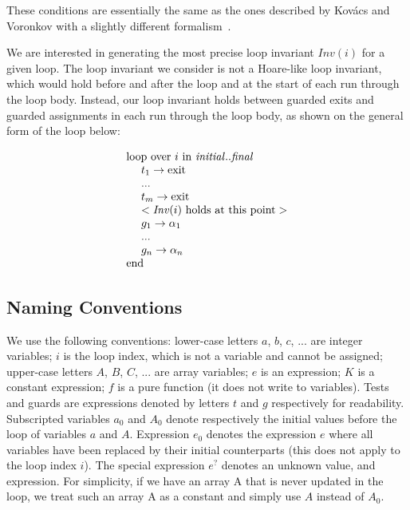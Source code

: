 \documentclass[a4paper,10pt]{article}
\newcommand{\idx}{\ensuremath{i}\xspace}
\newcommand{\idxinitial}{\ensuremath{\mathit{initial}}\xspace}
\newcommand{\idxfinal}{\ensuremath{\mathit{final}}\xspace}
\newcommand{\KWloop}{\ensuremath{\mathrm{loop}~}}
\newcommand{\KWend}{\ensuremath{\mathrm{end}~}}
\newcommand{\KWover}{\ensuremath{\mathrm{over}~}}
\newcommand{\KWin}{\ensuremath{~\mathrm{in}~}}
\newcommand{\KWexit}{\ensuremath{\mathrm{exit}}}
\newcommand{\Inv}[1]{\ensuremath{\mathit{Inv}(#1)\xspace}}
\begin{document}
These conditions are essentially the same as the ones described by Kov\'acs and
Voronkov with a slightly different formalism~\cite{kovacs:2009:fli}.

We are interested in generating the most precise loop invariant \Inv{\idx} for
a given loop. The loop invariant we consider is not a Hoare-like loop
invariant, which would hold before and after the loop and at the start of each
run through the loop body. Instead, our loop invariant holds between guarded
exits and guarded assignments in each run through the loop body, as shown on
the general form of the loop below:

$$\begin{array}{l}
  \KWloop \KWover i \KWin \idxinitial ..\idxfinal \\
  ~~~~ t_1 \rightarrow \KWexit \\
  ~~~~ ... \\
  ~~~~ t_m \rightarrow \KWexit \\
  ~~~~ < \textrm{\Inv{\idx} holds at this point} >\\
  ~~~~ g_1 \rightarrow \alpha_1 \\
  ~~~~ ... \\
  ~~~~ g_n \rightarrow \alpha_n \\
  \KWend
\end{array}$$

\subsection{Naming Conventions}
\label{sec:naming-conventions}

We use the following conventions: lower-case letters $a$, $b$, $c$, ... are integer
variables; \idx is the loop index, which is not a variable and cannot be
assigned; upper-case letters $A$, $B$, $C$, ... are array variables; $e$ is an
expression; $K$ is a constant expression; $f$ is a pure function (it does not
write to variables). Tests and guards are expressions denoted by letters $t$ and
$g$ respectively for readability. Subscripted variables $a_0$ and $A_0$ denote
respectively the initial values before the loop of variables $a$ and
$A$. Expression $e_0$ denotes the expression $e$ where all variables have been
replaced by their initial counterparts (this does not apply to the loop index
\idx).  The special expression $e^?$ denotes an unknown value, and expression.
For simplicity, if we have an array A that is never updated in the loop, we
treat such an array A as a constant and simply use $A$ instead of $A_0$.
\end{document}
